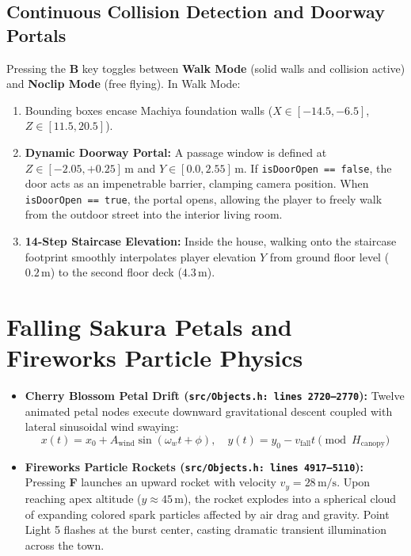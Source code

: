 \subsection{Continuous Collision Detection and Doorway Portals}
Pressing the \textbf{B} key toggles between \textbf{Walk Mode} (solid walls and collision active) and \textbf{Noclip Mode} (free flying). In Walk Mode:
\begin{enumerate}
    \item Bounding boxes encase Machiya foundation walls ($X \in [-14.5, -6.5]$, $Z \in [11.5, 20.5]$).
    \item \textbf{Dynamic Doorway Portal:} A passage window is defined at $Z \in [-2.05, +0.25]\,\text{m}$ and $Y \in [0.0, 2.55]\,\text{m}$. If \texttt{isDoorOpen == false}, the door acts as an impenetrable barrier, clamping camera position. When \texttt{isDoorOpen == true}, the portal opens, allowing the player to freely walk from the outdoor street into the interior living room.
    \item \textbf{14-Step Staircase Elevation:} Inside the house, walking onto the staircase footprint smoothly interpolates player elevation $Y$ from ground floor level ($0.2\,\text{m}$) to the second floor deck ($4.3\,\text{m}$).
\end{enumerate}

\section{Falling Sakura Petals and Fireworks Particle Physics}
\begin{itemize}
    \item \textbf{Cherry Blossom Petal Drift (\texttt{src/Objects.h: lines 2720--2770}):} Twelve animated petal nodes execute downward gravitational descent coupled with lateral sinusoidal wind swaying:
    \begin{equation}
    x(t) = x_0 + A_{\text{wind}} \sin(\omega_w t + \phi), \quad y(t) = y_0 - v_{\text{fall}} t \pmod{H_{\text{canopy}}}
    \end{equation}
    \item \textbf{Fireworks Particle Rockets (\texttt{src/Objects.h: lines 4917--5110}):} Pressing \textbf{F} launches an upward rocket with velocity $v_y = 28\,\text{m/s}$. Upon reaching apex altitude ($y \approx 45\,\text{m}$), the rocket explodes into a spherical cloud of expanding colored spark particles affected by air drag and gravity. Point Light 5 flashes at the burst center, casting dramatic transient illumination across the town.
\end{itemize}

